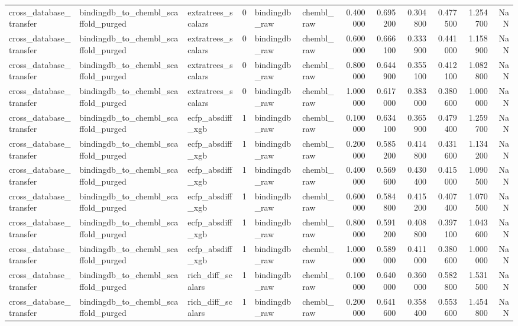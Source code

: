 \begin{longtable}{lllrllrrrrrr}
cross\_database\_transfer & bindingdb\_to\_chembl\_scaffold\_purged & extratrees\_scalars & 0 & bindingdb\_raw & chembl\_raw & 0.400000 & 0.695200 & 0.304800 & 0.477500 & 1.254700 & NaN \\
cross\_database\_transfer & bindingdb\_to\_chembl\_scaffold\_purged & extratrees\_scalars & 0 & bindingdb\_raw & chembl\_raw & 0.600000 & 0.666100 & 0.333900 & 0.441000 & 1.158900 & NaN \\
cross\_database\_transfer & bindingdb\_to\_chembl\_scaffold\_purged & extratrees\_scalars & 0 & bindingdb\_raw & chembl\_raw & 0.800000 & 0.644900 & 0.355100 & 0.412100 & 1.082800 & NaN \\
cross\_database\_transfer & bindingdb\_to\_chembl\_scaffold\_purged & extratrees\_scalars & 0 & bindingdb\_raw & chembl\_raw & 1.000000 & 0.617000 & 0.383000 & 0.380600 & 1.000000 & NaN \\
cross\_database\_transfer & bindingdb\_to\_chembl\_scaffold\_purged & ecfp\_absdiff\_xgb & 1 & bindingdb\_raw & chembl\_raw & 0.100000 & 0.634100 & 0.365900 & 0.479400 & 1.259700 & NaN \\
cross\_database\_transfer & bindingdb\_to\_chembl\_scaffold\_purged & ecfp\_absdiff\_xgb & 1 & bindingdb\_raw & chembl\_raw & 0.200000 & 0.585200 & 0.414800 & 0.431600 & 1.134200 & NaN \\
cross\_database\_transfer & bindingdb\_to\_chembl\_scaffold\_purged & ecfp\_absdiff\_xgb & 1 & bindingdb\_raw & chembl\_raw & 0.400000 & 0.569600 & 0.430400 & 0.415000 & 1.090500 & NaN \\
cross\_database\_transfer & bindingdb\_to\_chembl\_scaffold\_purged & ecfp\_absdiff\_xgb & 1 & bindingdb\_raw & chembl\_raw & 0.600000 & 0.584800 & 0.415200 & 0.407400 & 1.070500 & NaN \\
cross\_database\_transfer & bindingdb\_to\_chembl\_scaffold\_purged & ecfp\_absdiff\_xgb & 1 & bindingdb\_raw & chembl\_raw & 0.800000 & 0.591200 & 0.408800 & 0.397100 & 1.043600 & NaN \\
cross\_database\_transfer & bindingdb\_to\_chembl\_scaffold\_purged & ecfp\_absdiff\_xgb & 1 & bindingdb\_raw & chembl\_raw & 1.000000 & 0.589000 & 0.411000 & 0.380600 & 1.000000 & NaN \\
cross\_database\_transfer & bindingdb\_to\_chembl\_scaffold\_purged & rich\_diff\_scalars & 1 & bindingdb\_raw & chembl\_raw & 0.100000 & 0.640000 & 0.360000 & 0.582800 & 1.531500 & NaN \\
cross\_database\_transfer & bindingdb\_to\_chembl\_scaffold\_purged & rich\_diff\_scalars & 1 & bindingdb\_raw & chembl\_raw & 0.200000 & 0.641600 & 0.358400 & 0.553600 & 1.454800 & NaN \\

\end{longtable}
